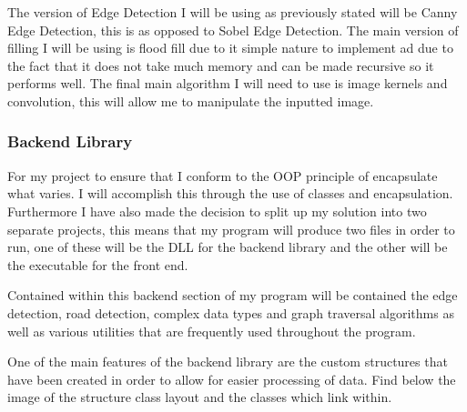 \begin{flushleft}
    \begin{figure}[H]
        \centering
    \end{figure}

    The version of Edge Detection I will be using as previously stated will be Canny Edge Detection, this is as opposed to Sobel Edge Detection. The main version of filling I will be using is flood fill due to it simple nature to implement ad due to the fact that it does not take much memory and can be made recursive so it performs well. The final main algorithm I will need to use is image kernels and convolution, this will allow me to manipulate the inputted image.

    \subsubsection{Backend Library}
    For my project to ensure that I conform to the OOP principle of encapsulate what varies. I will accomplish this through the use of classes and encapsulation. Furthermore I have also made the decision to split up my solution into two separate projects, this means that my program will produce two files in order to run, one of these will be the DLL for the backend library and the other will be the executable for the front end. \\ \bk

    Contained within this backend section of my program will be contained the edge detection, road detection, complex data types and graph traversal algorithms as well as various utilities that are frequently used throughout the program. \\ \bk

    One of the main features of the backend library are the custom structures that have been created in order to allow for easier processing of data. Find below the image of the structure class layout and the classes which link within.


\end{flushleft}
